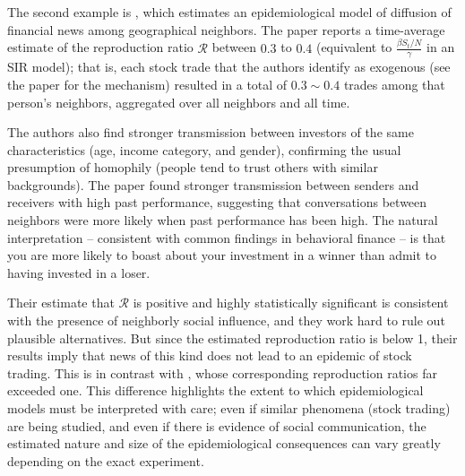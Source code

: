 The second example is \href{https://github.com/iworld1991/EpiExp/blob/master/Literature/huang2021rate.pdf}{ \cite{huang2021rate}}, which estimates an epidemiological model of diffusion of financial news among geographical neighbors. The paper reports a time-average estimate of the reproduction ratio $\mathcal{R}$ between $0.3$ to $0.4$ (equivalent to $\frac{\beta S_t/N}{\gamma}$ in an SIR model); that is, each stock trade that the authors identify as exogenous (see the paper for the mechanism) resulted in a total of $0.3{\sim}0.4$ trades among that person's neighbors, aggregated over all neighbors and all time.

The authors also find stronger transmission between investors of the same characteristics (age, income category, and gender), confirming the usual presumption of homophily (people tend to trust others with similar backgrounds). The paper found stronger transmission between senders and receivers with high past performance, suggesting that conversations between neighbors were more likely when past performance has been high.  The natural interpretation -- consistent with common findings in behavioral finance -- is that you are more likely to boast about your investment in a winner than admit to having invested in a loser.

Their estimate that $\mathcal{R}$ is positive and highly statistically significant is consistent with the presence of neighborly social influence, and they work hard to rule out plausible alternatives. But since the estimated reproduction ratio is below  1, their results imply that news of this kind does not lead to an epidemic of stock trading.  This is in contrast with \cite{shiller1989survey}, whose corresponding reproduction ratios far exceeded one.  This difference highlights the extent to which epidemiological models must be interpreted with care; even if similar phenomena (stock trading) are being studied, and even if there is evidence of social communication, the estimated nature and size of the epidemiological consequences can vary greatly depending on the exact experiment.

